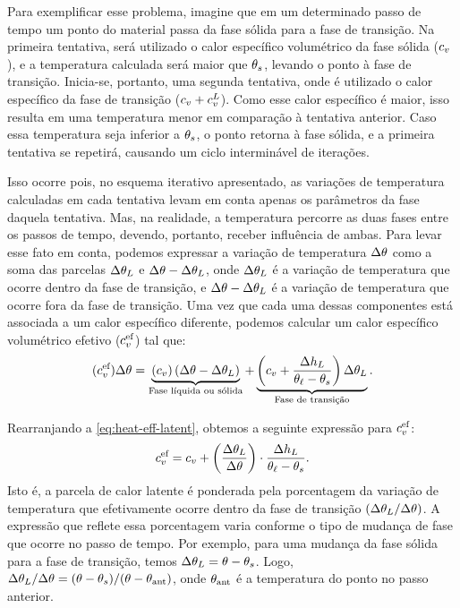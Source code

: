 \documentclass[Tese.tex]{subfiles}
\begin{document}
Para exemplificar esse problema, imagine que em um determinado passo de tempo um ponto do material passa da fase sólida para a fase de transição. Na primeira tentativa, será utilizado o calor específico volumétrico da fase sólida ($c_v$), e a temperatura calculada será maior que $\theta_s$, levando o ponto à fase de transição. Inicia-se, portanto, uma segunda tentativa, onde é utilizado o calor específico da fase de transição ($c_v+c_v^L$). Como esse calor específico é maior, isso resulta em uma temperatura menor em comparação à tentativa anterior. Caso essa temperatura seja inferior a $\theta_s$, o ponto retorna à fase sólida, e a primeira tentativa se repetirá, causando um ciclo interminável de iterações.

Isso ocorre pois, no esquema iterativo apresentado, as variações de temperatura calculadas em cada tentativa levam em conta apenas os parâmetros da fase daquela tentativa. Mas, na realidade, a temperatura percorre as duas fases entre os passos de tempo, devendo, portanto, receber influência de ambas. Para levar esse fato em conta, podemos expressar a variação de temperatura $\Delta\theta$ como a soma das parcelas $\Delta\theta_{L}$ e $\Delta\theta-\Delta\theta_{L}$, onde $\Delta\theta_{L}$ é a variação de temperatura que ocorre dentro da fase de transição, e $\Delta\theta-\Delta\theta_{L}$ é a variação de temperatura que ocorre fora da fase de transição. Uma vez que cada uma dessas componentes está associada a um calor específico diferente, podemos calcular um calor específico volumétrico efetivo ($c_v^\text{ef}$) tal que:
\begin{equation}\label{eq:heat-eff-latent}
(c_v^\text{ef})\Delta\theta = \underbrace{\left(c_v\right)(\Delta\theta-\Delta\theta_{L})}_\text{Fase líquida ou sólida} + \underbrace{\left(c_v + \dfrac{\Delta h_L}{\theta_\ell-\theta_s} \right)\Delta\theta_{L}}_\text{Fase de transição}.
\end{equation}

Rearranjando a \cref{eq:heat-eff-latent}, obtemos a seguinte expressão para $c_v^\text{ef}$:
\begin{equation}\label{eq:heat-eff}
c_v^\text{ef} = c_v + \left(\dfrac{\Delta\theta_{L}}{\Delta\theta}\right)\cdot\dfrac{\Delta h_L}{\theta_\ell-\theta_s}.
\end{equation}
Isto é, a parcela de calor latente é ponderada pela porcentagem da variação de temperatura que efetivamente ocorre dentro da fase de transição $\left({\Delta\theta_{L}}/{\Delta\theta}\right)$. A expressão que reflete essa porcentagem varia conforme o tipo de mudança de fase que ocorre no passo de tempo. Por exemplo, para uma mudança da fase sólida para a fase de transição, temos $\Delta\theta_{L} = \theta - \theta_s$. Logo, ${\Delta\theta_{L}}/{\Delta\theta} = (\theta - \theta_s)/(\theta-\theta_\text{ant})$, onde $\theta_\text{ant}$ é a temperatura do ponto no passo anterior.
\end{document}
